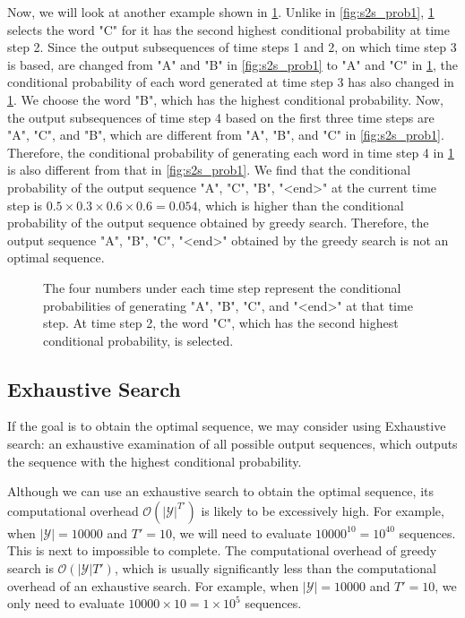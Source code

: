 Now, we will look at another example shown in \cref{fig:s2s_prob2}. Unlike in \cref{fig:s2s_prob1}, \cref{fig:s2s_prob2} selects the word "C" for it has the second highest conditional probability at time step 2. Since the output subsequences of time steps 1 and 2, on which time step 3 is based, are changed from "A" and "B" in \cref{fig:s2s_prob1} to "A" and "C" in \cref{fig:s2s_prob2}, the conditional probability of each word generated at time step 3 has also changed in \cref{fig:s2s_prob2}. We choose the word "B", which has the highest conditional probability. Now, the output subsequences of time step 4 based on the first three time steps are "A", "C", and "B", which are different from "A", "B", and "C" in \cref{fig:s2s_prob1}. Therefore, the conditional probability of generating each word in time step 4 in \cref{fig:s2s_prob2} is also different from that in \cref{fig:s2s_prob1}. We find that the conditional probability of the output sequence "A", "C", "B", "<end>" at the current time step is $0.5\times0.3 \times0.6\times0.6=0.054$, which is higher than the conditional probability of the output sequence obtained by greedy search. Therefore, the output sequence "A", "B", "C", "<end>" obtained by the greedy search is not an optimal sequence.

\begin{figure}[hpt]
    \centering
    
    \caption{The four numbers under each time step represent the conditional probabilities of generating "A", "B", "C", and "<end>" at that time step.  At time step 2, the word "C", which has the second highest conditional probability, is selected.}
    \label{fig:s2s_prob2}
\end{figure}

\subsection{Exhaustive Search}\label{subsec:exhaustive-search}

If the goal is to obtain the optimal sequence, we may consider using Exhaustive search: an exhaustive examination of all possible output sequences, which outputs the sequence with the highest conditional probability.

Although we can use an exhaustive search to obtain the optimal sequence, its computational overhead $\mathcal{O}(\left|\mathcal{Y}\right|^{T'})$ is likely to be excessively high. For example, when $|\mathcal{Y}|=10000$ and $T'=10$, we will need to evaluate $10000^{10} = 10^{40}$ sequences. This is next to impossible to complete. The computational overhead of greedy search is $\mathcal{O}(\left|\mathcal{Y}\right|T')$, which is usually significantly less than the computational overhead of an exhaustive search. For example, when $|\mathcal{Y}|=10000$ and $T'=10$, we only need to evaluate $10000\times10=1\times10^5$ sequences.

